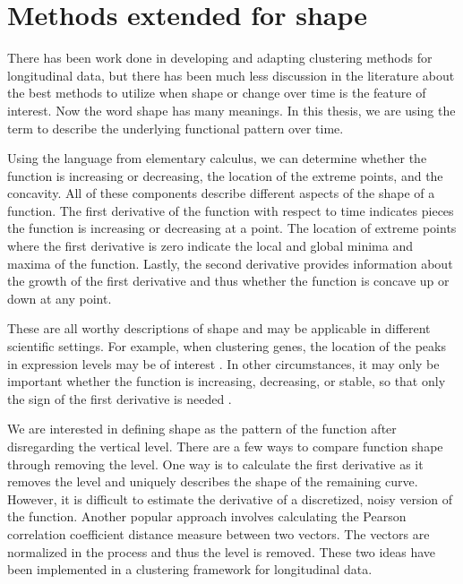 \section{Methods extended for shape}
There has been work done in developing and adapting clustering methods for longitudinal data, but there has been much less discussion in the literature about the best methods to utilize when shape or change over time is the feature of interest. Now the word shape has many meanings. In this thesis, we are using the term to describe the underlying functional pattern over time.

Using the language from elementary calculus, we can determine whether the function is increasing or decreasing, the location of the extreme points, and the concavity. All of these components describe different aspects of the shape of a function. The first derivative of the function with respect to time indicates pieces the function is increasing or decreasing at a point. The location of extreme points where the first derivative is zero indicate the local and global minima and maxima of the function. Lastly, the second derivative provides information about the growth of the first derivative and thus whether the function is concave up or down at any point.

These are all worthy descriptions of shape and may be applicable in different scientific settings. For example, when clustering genes, the location of the peaks in expression levels may be of interest \cite{luan2003}. In other circumstances, it may only be important whether the function is increasing, decreasing, or stable, so that only the sign of the first derivative is needed \cite{phang2003}. 

We are interested in defining shape as the pattern of the function after disregarding the vertical level. There are a few ways to compare function shape through removing the level. One way is to calculate the first derivative as it removes the level and uniquely describes the shape of the remaining curve. However, it is difficult to estimate the derivative of a discretized, noisy version of the function. Another popular approach involves calculating the Pearson correlation coefficient distance measure between two vectors. The vectors are normalized in the process  and thus the level is removed. These two ideas have been implemented in a clustering framework for longitudinal data.

